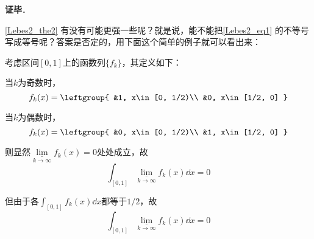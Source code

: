 \textbf{证毕}．

\autoref{Lebes2_the2} 有没有可能更强一些呢？就是说，能不能把\autoref{Lebes2_eq1} 的不等号写成等号呢？答案是否定的，用下面这个简单的例子就可以看出来：

\begin{example}{}
考虑区间$[0, 1]$上的函数列$\{f_k\}$，其定义如下：

当$k$为奇数时，
\begin{equation}
f_k(x)=\leftgroup{
    &1, x\in[0, 1/2)\\
    &0, x\in[1/2, 0]
}
\end{equation}

当$k$为偶数时，
\begin{equation}
f_k(x)=\leftgroup{
    &0, x\in[0, 1/2)\\
    &1, x\in[1/2, 0]
}
\end{equation}

则显然$\underline{\lim}\limits_{k\to \infty}f_k(x)=0$处处成立，故
\begin{equation}
\int_{[0, 1]} \underline{\lim}\limits_{k\to \infty}f_k(x) \dd x = 0
\end{equation}

但由于各$\int_{[0, 1]} f_k(x) \dd x$都等于$1/2$，故
\begin{equation}
\int_{[0, 1]} \underline{\lim}\limits_{k\to \infty}f_k(x) \dd x = 0
\end{equation}

\end{example}








